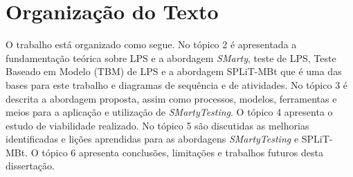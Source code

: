 \section{Organização do Texto}
\label{cap1sec:organizacao}
O trabalho está organizado como segue. No tópico 2 é apresentada a fundamentação teórica sobre LPS e a abordagem \textit{SMarty}, teste de LPS, Teste Baseado em Modelo (TBM) de LPS e a abordagem SPLiT-MBt que é uma das bases para este trabalho e diagramas de sequência e de atividades. No tópico 3 é descrita a abordagem proposta, assim como processos, modelos, ferramentas e meios para a aplicação e utilização de \textit{SMartyTesting}. O tópico 4 apresenta o estudo de viabilidade realizado. No tópico 5 são discutidas as melhorias identificadas e lições aprendidas para as abordagens \textit{SMartyTesting} e SPLiT-MBt. O tópico 6  apresenta conclusões, limitações e trabalhos futuros desta dissertação. 


